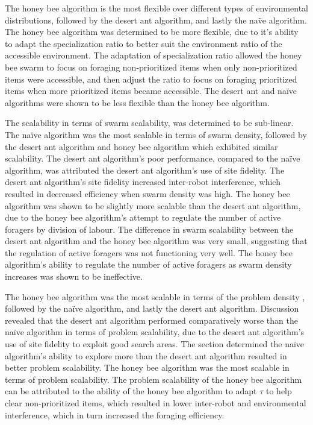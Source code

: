 The honey bee algorithm is the most flexible over different types of environmental distributions, followed by the desert ant algorithm, and lastly the na\"ve algorithm. The honey bee algorithm was determined to be more flexible, due to it's ability to adapt the specialization ratio to better suit the environment ratio of the accessible environment. The adaptation of specialization ratio allowed the honey bee swarm to focus on foraging non-prioritized items when only non-prioritized items were accessible, and then adjust the ratio to focus on foraging prioritized items when more prioritized items became accessible. The desert ant and na\"ive algorithms were shown to be less flexible than the honey bee algorithm. 

The scalability in terms of swarm scalability, was determined to be sub-linear. The na\"ive algorithm was the most scalable in terms of swarm density, followed by the desert ant algorithm and honey bee algorithm which exhibited similar scalability. The desert ant algorithm's poor performance, compared to the na\"ive algorithm, was attributed the desert ant algorithm's use of site fidelity. The desert ant algorithm's site fidelity increased inter-robot interference, which resulted in decreased efficiency when swarm density was high. The honey bee algorithm was shown to be slightly more scalable than the desert ant algorithm, due to the honey bee algorithm's attempt to regulate the number of active foragers by division of labour. The difference in swarm scalability between the desert ant algorithm and the honey bee algorithm was very small, suggesting that the regulation of active foragers was not functioning very well. The honey bee algorithm's ability to regulate the number of active foragers as swarm density increases was shown to be ineffective. 

The honey bee algorithm was the most scalable in terms of the problem density , followed by the na\"ive algorithm, and lastly the desert ant algorithm. Discussion revealed that the desert ant algorithm performed comparatively worse than the na\"ive algorithm in terms of problem scalability, due to the desert ant algorithm's use of site fidelity to exploit good search areas. The section determined the na\"ive algorithm's ability to explore more than the desert ant algorithm resulted in better problem scalability. The honey bee algorithm was the most scalable in terms of problem scalability. The problem scalability of the honey bee algorithm can be attributed to the ability of the honey bee algorithm to adapt $\tau$ to help clear non-prioritized items, which resulted in lower inter-robot and environmental interference, which in turn increased the foraging efficiency.


